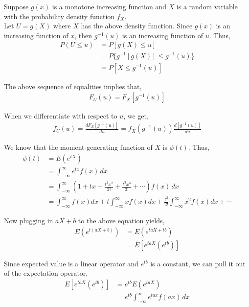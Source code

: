 \documentclass[12pt]{article}
\newenvironment{problem}[2][Problem]{\begin{trivlist}
\item[\hskip \labelsep {\bfseries #1}\hskip \labelsep {\bfseries #2.}]}{\end{trivlist}}
\begin{document}
Suppose $g(x)$ is a monotone increasing function and $X$ is a random variable with the probability density function $f_X$.\\

Let $U = g(X)$ where $X$ has the above density function. Since $g(x)$ is an increasing function of $x$, then $g^{-1}(u)$ is an increasing function of $u$. Thus,
\begin{align*}
P(U \leq u) &= P[g(X) \leq u]\\
&= P\{g^{-1}[g(X)] \leq g^{-1}(u)\}\\
&= P[X \leq g^{-1}(u)]
\end{align*}

The above sequence of equalities implies that,
\begin{align*}
F_U(u) = F_X[g^{-1}(u)]
\end{align*}

When we differentiate with respect to $u$, we get,
\begin{align*}
f_U(u) = \frac{dF_X[g^{-1}(u)]}{du} = f_X(g^{-1}(u))\frac{d[g^{-1}(u)]}{du}
\end{align*}

\begin{problem}{5}
\end{problem}

We know that the moment-generating function of $X$ is $\phi(t)$. Thus, 
\begin{align*}
\phi(t) &= E(e^{tX})\\
&= \int_{-\infty}^{\infty} e^{tx} f(x) \, dx\\
&= \int_{-\infty}^{\infty} \left(1 + tx + \frac{t^2x^2}{2!} + \frac{t^3x^3}{3!} + \cdots \right) f(x) \, dx\\
&= \int_{-\infty}^{\infty} f(x) dx + t \int_{-\infty}^{\infty} xf(x)dx + \frac{t^2}{2!} \int_{-\infty}^{\infty} x^2f(x)dx + \cdots
\end{align*}

Now plugging in $aX + b$ to the above equation yields,
\begin{align*}
E(e^{t(aX+b)}) &= E(e^{taX + tb})\\
&= E[e^{taX}(e^{tb})]
\end{align*}

Since expected value is a linear operator and $e^{tb}$ is a constant, we can pull it out of the expectation operator,
\begin{align*}
E[e^{taX}(e^{tb})] &= e^{tb} E(e^{taX})\\
&= e^{tb} \int_{-\infty}^{\infty} e^{tax} f(ax) \, dx
\end{align*}
\end{document}
